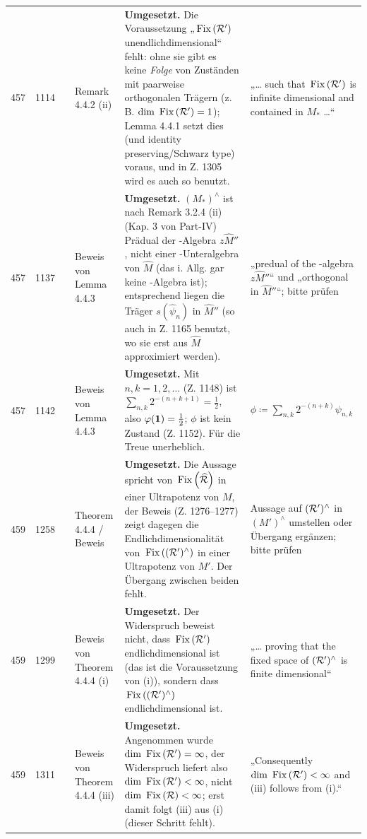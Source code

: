 \documentclass[10pt]{article}
\begin{document}
\begin{longtable}{@{}rrc>{\RaggedRight\arraybackslash}p{3.0cm}>{\RaggedRight\arraybackslash}p{11.4cm}>{\RaggedRight\arraybackslash}p{7.4cm}@{}}
457 & 1114 & \sichB{} & Remark 4.4.2 (ii) & \textbf{Umgesetzt.} Die Voraussetzung „$\mathop{}\mathrm{Fix}\left(\mathcal{R}'\right)$ unendlichdimensional“ fehlt: ohne sie gibt es keine \emph{Folge} von Zuständen mit paarweise orthogonalen Trägern (z. B. $\mathop{}\!\mathrm{dim}\,\mathop{}\mathrm{Fix}\left(\mathcal{R}'\right) = 1$); Lemma 4.4.1 setzt dies (und identity preserving/Schwarz type) voraus, und in Z. 1305 wird es auch so benutzt. & „\dots{} such that $\mathop{}\mathrm{Fix}\left(\mathcal{R}'\right)$ is infinite dimensional and contained in $M_{*}$ \dots{}“ \\[2pt]
457 & 1137 & \sichC{} & Beweis von Lemma 4.4.3 & \textbf{Umgesetzt.} $(M_{*})^{\wedge}$ ist nach Remark 3.2.4 (ii) (Kap. 3 von Part-IV) Prädual der {\WA{}}-Algebra $z\widehat{M}''$, nicht einer {\WA{}}-Unteralgebra von $\widehat{M}$ (das i. Allg. gar keine {\WA{}}-Algebra ist); entsprechend liegen die Träger $s(\widehat{\psi}_{n})$ in $\widehat{M}''$ (so auch in Z. 1165 benutzt, wo sie erst aus $\widehat{M}$ approximiert werden). & „predual of the {\WA{}}-algebra $z\widehat{M}''$“ und „orthogonal in $\widehat{M}''$“; bitte prüfen \\[2pt]
457 & 1142 & \sichA{} & Beweis von Lemma 4.4.3 & \textbf{Umgesetzt.} Mit $n,k = 1,2,\ldots$ (Z. 1148) ist $\sum_{n,k} 2^{-(n+k+1)} = \tfrac{1}{2}$, also $\phi(\1) = \tfrac{1}{2}$; $\phi$ ist kein Zustand (Z. 1152). Für die Treue unerheblich. & $\phi \coloneqq \sum_{n,k} 2^{-(n+k)} \psi_{n,k}$ \\[2pt]
459 & 1258 & \sichC{} & Theorem 4.4.4 / Beweis & \textbf{Umgesetzt.} Die Aussage spricht von $\mathop{}\mathrm{Fix}\left(\widehat{\mathcal{R}}\right)$ in einer Ultrapotenz von $M$, der Beweis (Z. 1276–1277) zeigt dagegen die Endlichdimensionalität von $\mathop{}\mathrm{Fix}\left((\mathcal{R}')^{\wedge}\right)$ in einer Ultrapotenz von $M'$. Der Übergang zwischen beiden fehlt. & Aussage auf $(\mathcal{R}')^{\wedge}$ in $(M')^{\wedge}$ umstellen oder Übergang ergänzen; bitte prüfen \\[2pt]
459 & 1299 & \sichB{} & Beweis von Theorem 4.4.4 (i) & \textbf{Umgesetzt.} Der Widerspruch beweist nicht, dass $\mathop{}\mathrm{Fix}\left(\mathcal{R}'\right)$ endlichdimensional ist (das ist die Voraussetzung von (i)), sondern dass $\mathop{}\mathrm{Fix}\left((\mathcal{R}')^{\wedge}\right)$ endlichdimensional ist. & „\dots{} proving that the fixed space of $(\mathcal{R}')^{\wedge}$ is finite dimensional“ \\[2pt]
459 & 1311 & \sichB{} & Beweis von Theorem 4.4.4 (iii) & \textbf{Umgesetzt.} Angenommen wurde $\mathop{}\!\mathrm{dim}\,\mathop{}\mathrm{Fix}\left(\mathcal{R}'\right) = \infty$, der Widerspruch liefert also $\mathop{}\!\mathrm{dim}\,\mathop{}\mathrm{Fix}\left(\mathcal{R}'\right) < \infty$, nicht $\mathop{}\!\mathrm{dim}\,\mathop{}\mathrm{Fix}\left(\mathcal{R}\right) < \infty$; erst damit folgt (iii) aus (i) (dieser Schritt fehlt). & „Consequently $\mathop{}\!\mathrm{dim}\, \mathop{}\mathrm{Fix}\left(\mathcal{R}'\right) < \infty$ and (iii) follows from (i).“ \\[2pt]

\end{longtable}
\end{document}
